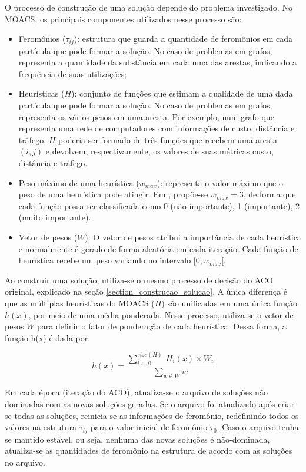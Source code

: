 O processo de construção de uma solução depende do problema investigado. No MOACS, os principais componentes utilizados nesse processo são:

\begin{itemize}  
	\item Feromônios ($\tau_{ij}$): estrutura que guarda a quantidade de feromônios em cada partícula que pode formar a solução. No caso de problemas em grafos, representa a quantidade da substância em cada uma das arestas, indicando a frequência de suas utilizações;
	\item Heurísticas ($H$): conjunto de funções que estimam a qualidade de uma dada partícula que pode formar a solução. No caso de problemas em grafos, representa os vários pesos em uma aresta. Por exemplo, num grafo que representa uma rede de computadores com informações de custo, distância e tráfego, $H$ poderia ser formado de três funções que recebem uma aresta $(i,j)$ e devolvem, respectivamente, os valores de suas métricas custo, distância e tráfego.
	\item Peso máximo de uma heurística ($w_{max}$): representa o valor máximo que o peso de uma heurística pode atingir. Em \cite{Riveros2016}, propõe-se $w_{max} = 3$, de forma que cada função possa ser classificada como 0 (não importante), 1 (importante), 2 (muito importante).
	\item Vetor de pesos ($W$): O vetor de pesos atribui a importância de cada heurística e normalmente é gerado de forma aleatória em cada iteração. Cada função de heurística recebe um peso variando no intervalo $[0, w_{max}[$.
\end{itemize}

Ao construir uma solução, utiliza-se o mesmo processo de decisão do ACO original, explicado na seção \ref{section_construcao_solucao}. A única diferença é que as múltiplas heurísticas do MOACS ($H$) são unificadas em uma única função $h(x)$, por meio de uma média ponderada. Nesse processo, utiliza-se o vetor de pesos $W$ para definir o fator de ponderação de cada heurística. Dessa forma, a função h(x) é dada por:

\[h(x) = \frac{\sum_{i \gets 0}^{size(H)}\ H_i(x) \times W_i}{\sum_{w \in W} w}\]

Em cada época (iteração do ACO), atualiza-se o arquivo de soluções não dominadas com as novas soluções geradas. Se o arquivo foi atualizado após criar-se todas as soluções, reinicia-se as informações de feromônio, redefinindo todos os valores na estrutura $\tau_{ij}$ para o valor inicial de feromônio $\tau_0$. Caso o arquivo tenha se mantido estável, ou seja, nenhuma das novas soluções é não-dominada, atualiza-se as quantidades de feromônio na estrutura de acordo com as soluções no arquivo.

